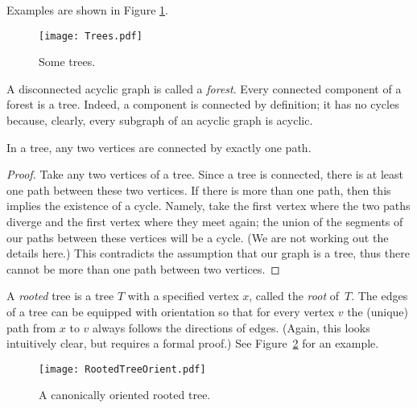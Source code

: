 \begin{page}

Examples are shown in Figure \ref{fig:Trees}.

\begin{figure}[ht]
\begin{center}
\texttt{[image: Trees.pdf]}
\end{center}
\caption{Some trees.}
\label{fig:Trees}
\end{figure}

A disconnected acyclic graph is called a \emph{forest}.
Every connected component of a forest is a tree.
Indeed, a component is connected by definition; it has no cycles because, clearly, every subgraph of an acyclic graph is acyclic.


\end{page}

\begin{page}

\begin{thm}
In a tree, any two vertices are connected by exactly one path.
\end{thm}

\end{page}

\begin{page}

\begin{proof}
Take any two vertices of a tree.
Since a tree is connected, there is at least one path between these two vertices.
If there is more than one path, then this implies the existence of a cycle.
Namely, take the first vertex where the two paths diverge and the first vertex where they meet again;
the union of the segments of our paths between these vertices will be a cycle.
(We are not working out the details here.)
This contradicts the assumption that our graph is a tree, thus there cannot be more than one path between two vertices.
\end{proof}

A \emph{rooted} tree is a tree $T$ with a specified vertex $x$, called the \emph{root} of~$T$.
The edges of a tree can be equipped with orientation so that for every vertex $v$ the (unique) path from $x$ to $v$ always follows the directions of edges.
(Again, this looks intuitively clear, but requires a formal proof.)
See Figure~\ref{fig:RootedTreeOrient} for an example.

\begin{figure}[ht]
\begin{center}
\texttt{[image: RootedTreeOrient.pdf]}
\end{center}
\caption{A canonically oriented rooted tree.}
\label{fig:RootedTreeOrient}
\end{figure}



\end{page}

